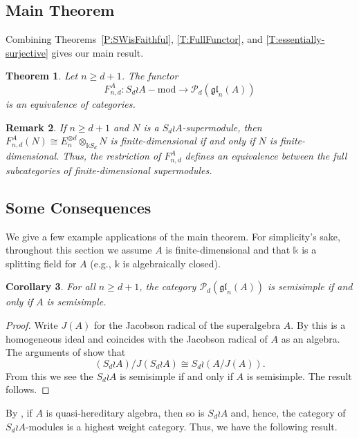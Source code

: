 \documentclass[11pt,reqno]{amsart} %
\newtheorem{theorem}{Theorem}[subsection]
\newtheorem{corollary}[theorem]{Corollary}
\newtheorem{remark}[theorem]{Remark}
\newcommand{\gl}{\mathfrak{gl}}
\renewcommand{\k}{\mathds{k}}
\newcommand{\0}{\bar{0}}
\newcommand{\1}{\bar{1}}
\newcommand{\wreath}{\wr}
\newcommand{\SdwreathA}{S_{d} \wreath A}
\newcommand{\Pol}{\mathcal{P}}
\numberwithin{equation}{subsection}
\begin{document}
\subsection{Main Theorem}\label{SS:MainTheorem}



Combining Theorems~\ref{P:SWisFaithful}, \ref{T:FullFunctor}, and \ref{T:essentially-surjective} gives our main result. 
\begin{theorem}\label{T:main-theorem}  Let $n \geq d+1$.  The functor  
\[
F^{A}_{n,d}: \SdwreathA-\textrm{mod} \to \Pol_{d}(\gl_{n}(A))
\] is an equivalence of categories.
\end{theorem}

\begin{remark}\label{R:finite-dimensional-case}
 If $n \geq d+1$ and $N$ is a $\SdwreathA$-supermodule, then $F^{A}_{n,d}(N) \cong E_{n}^{\otimes d} \otimes_{\k S_{d}} N$ is finite-dimensional if and only if $N$ is finite-dimensional. Thus, the restriction of $F^{A}_{n,d}$ defines an equivalence between the full subcategories of finite-dimensional supermodules.
\end{remark}


\subsection{Some Consequences}  We give a few example applications of the main theorem.  For simplicity's sake, throughout this section we assume $A$ is finite-dimensional and that $\k$ is a splitting field for $A$ (e.g., $\k$ is algebraically closed).


\begin{corollary}\label{C:semisimple}  For all $n \geq d+1$,  the category $\Pol_{d}(\gl_{n}(A))$ is semisimple if and only if $A$ is semisimple.
\end{corollary}

\begin{proof} Write $J(A)$ for the Jacobson radical of the superalgebra $A$. By \cite[Lemma 2.6]{BK} this is a homogeneous ideal and coincides with the Jacobson radical of $A$ as an algebra. The arguments of \cite[Section 3]{CT}  show that
\[
(\SdwreathA )/J(\SdwreathA ) \cong S_{d} \wr \left(A/J(A) \right).
\]  From this we see the $\SdwreathA$ is semisimple if and only if $A$ is semisimple.  The result follows.
\end{proof}

By \cite[Section 6]{CT}, if $A$ is quasi-hereditary algebra, then so is $\SdwreathA$ and, hence, the category of $\SdwreathA$-modules is a highest weight category.  Thus, we have the following result.
\end{document}
